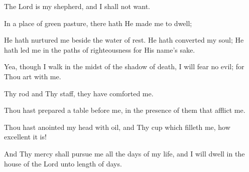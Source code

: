 The Lord is my shepherd, and I shall not want.

In a place of green pasture, there hath He made me to dwell;

He hath nurtured me beside the water of rest. He hath converted my soul; He hath led me in the paths of righteousness for His name's sake.

Yea, though I walk in the midst of the shadow of death, I will fear no evil; for Thou art with me.

Thy rod and Thy staff, they have comforted me.

Thou hast prepared a table before me, in the presence of them that afflict me.

Thou hast anointed my head with oil, and Thy cup which filleth me, how excellent it is!

And Thy mercy shall pursue me all the days of my life, and I will dwell in the house of the Lord unto length of days.
